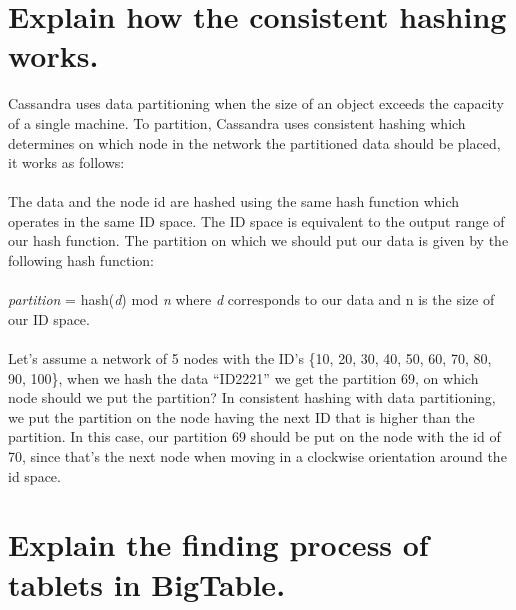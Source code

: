 \documentclass{article}
\begin{document}
\clearpage
\section{Explain how the consistent hashing works.}

Cassandra uses data partitioning when the size of an object exceeds the capacity of a single machine. To partition, Cassandra uses consistent hashing which determines on which node in the network the partitioned data should be placed, it works as follows: 
\\\\
The data and the node id are hashed using the same hash function which operates in the same ID space. The ID space is equivalent to the output range of our hash function. The partition on which we should put our data is given by the following hash function: 
\\\\
\textit{partition} = hash(\textit{d}) mod \textit{n} where \textit{d} corresponds to our data and n is the size of our ID space. 
\\\\
Let's assume a network of 5 nodes with the ID’s \{10, 20, 30, 40, 50, 60, 70, 80, 90, 100\}, when we hash the data “ID2221”  we get the partition 69, on which node should we put the partition? In consistent hashing with data partitioning, we put the partition on the node having the next ID that is higher than the partition. In this case, our partition 69 should be put on the node with the id of 70, since that’s the next node when moving in a clockwise orientation around the id space. 

\clearpage
\section{Explain the finding process of tablets in BigTable.}
\end{document}
